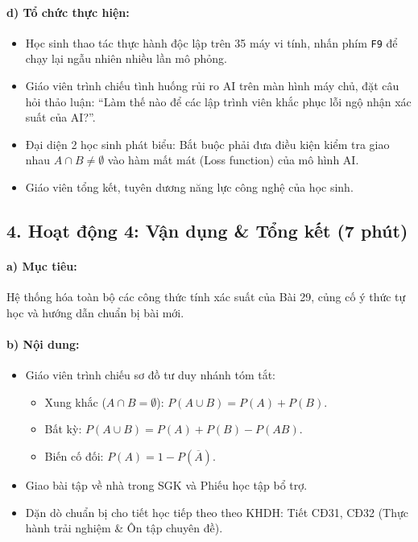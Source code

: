 \documentclass[12pt, a4paper]{article}
\begin{document}
\paragraph{d) Tổ chức thực hiện:}
\begin{itemize}[leftmargin=0.8cm]
    \item Học sinh thao tác thực hành độc lập trên 35 máy vi tính, nhấn phím \texttt{F9} để chạy lại ngẫu nhiên nhiều lần mô phỏng.
    \item Giáo viên trình chiếu tình huống rủi ro AI trên màn hình máy chủ, đặt câu hỏi thảo luận: ``Làm thế nào để các lập trình viên khắc phục lỗi ngộ nhận xác suất của AI?''.
    \item Đại diện 2 học sinh phát biểu: Bắt buộc phải đưa điều kiện kiểm tra giao nhau $A \cap B \neq \emptyset$ vào hàm mất mát (Loss function) của mô hình AI.
    \item Giáo viên tổng kết, tuyên dương năng lực công nghệ của học sinh.
\end{itemize}

\subsection*{4. Hoạt động 4: Vận dụng \& Tổng kết (7 phút)}

\paragraph{a) Mục tiêu:} Hệ thống hóa toàn bộ các công thức tính xác suất của Bài 29, củng cố ý thức tự học và hướng dẫn chuẩn bị bài mới.

\paragraph{b) Nội dung:}
\begin{itemize}[leftmargin=0.6cm]
    \item Giáo viên trình chiếu sơ đồ tư duy nhánh tóm tắt:
    \begin{itemize}[leftmargin=0.4cm]
        \item Xung khắc ($A \cap B = \emptyset$): $P(A \cup B) = P(A) + P(B)$.
        \item Bất kỳ: $P(A \cup B) = P(A) + P(B) - P(AB)$.
        \item Biến cố đối: $P(A) = 1 - P(\overline{A})$.
    \end{itemize}
    \item Giao bài tập về nhà trong SGK và Phiếu học tập bổ trợ.
    \item Dặn dò chuẩn bị cho tiết học tiếp theo theo KHDH: Tiết CĐ31, CĐ32 (Thực hành trải nghiệm \& Ôn tập chuyên đề).
\end{itemize}
\end{document}
